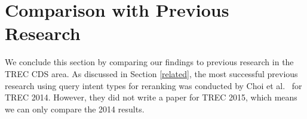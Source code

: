 %
%
%

\section{Comparison with Previous Research}
We conclude this section by comparing our findings to previous research in the TREC CDS area.
As discussed in Section \ref{related}, the most successful previous research using query intent types for reranking
was conducted by Choi et al.~\cite{choi} for TREC 2014. However, they did not write a paper for TREC 2015,
which means we can only compare the 2014 results.

